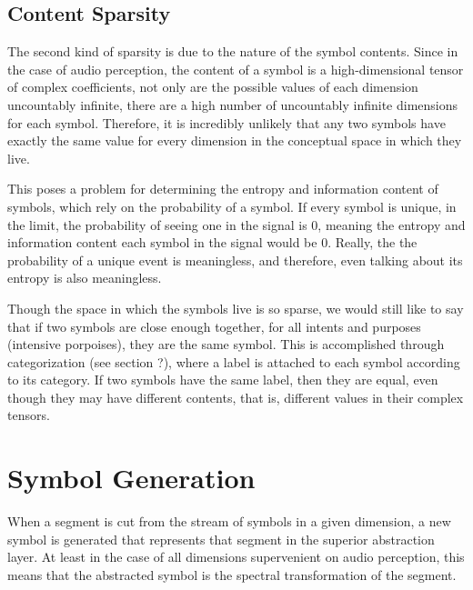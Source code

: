 \subsection{Content Sparsity}
The second kind of sparsity is due to the nature of the symbol contents.  Since in the case of audio perception, the content of a symbol is a high-dimensional tensor of complex coefficients, not only are the possible values of each dimension uncountably infinite, there are a high number of uncountably infinite dimensions for each symbol.  Therefore, it is incredibly unlikely that any two symbols have exactly the same value for every dimension in the conceptual space in which they live.  

This poses a problem for determining the entropy and information content of symbols, which rely on the probability of a symbol.  If every symbol is unique, in the limit, the probability of seeing one in the signal is 0, meaning the entropy and information content each symbol in the signal would be 0. Really, the the probability of a unique event is meaningless, and therefore, even talking about its entropy is also meaningless.  

Though the space in which the symbols live is so sparse, we would still like to say that if two symbols are close enough together, for all intents and purposes (intensive porpoises), they are the same symbol.  This is accomplished through categorization (see section ?), where a label is attached to each symbol according to its category.  If two symbols have the same label, then they are equal, even though they may have different contents, that is, different values in their complex tensors.

\section{Symbol Generation}
When a segment is cut from the stream of symbols in a given dimension, a new symbol is generated that represents that segment in the superior abstraction layer.  At least in the case of all dimensions supervenient on audio perception, this means that the abstracted symbol is the spectral transformation of the segment.
